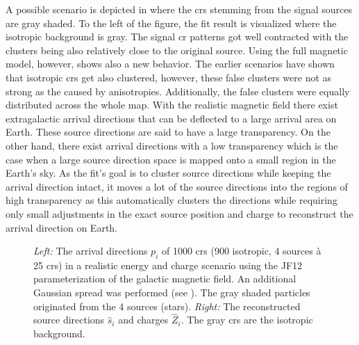 A possible scenario is depicted in  where the \glspl{cr} stemming from the signal sources are gray shaded. To the left of the figure, the fit result is visualized where the isotropic background is gray. The signal \gls{cr} patterns got well contracted with the clusters being also relatively close to the original source. Using the full magnetic model, however, shows also a new behavior. The earlier scenarios have shown that isotropic \glspl{cr} get also clustered, however, these false clusters were not as strong as the caused by anisotropies. Additionally, the false clusters were equally distributed across the whole map. With the realistic magnetic field there exist extragalactic arrival directions that can be deflected to a large arrival area on Earth. These source directions are said to have a large transparency. On the other hand, there exist arrival directions with a low transparency which is the case when a large source direction space is mapped onto a small region in the Earth's sky. As the fit's goal is to cluster source directions while keeping the arrival direction intact, it moves a lot of the source directions into the regions of high transparency as this automatically clusters the directions while requiring only small adjustments in the exact source position and charge to reconstruct the arrival direction on Earth.
\begin{figure}[ht!]
    \centering
    \begin{minipage}{0.49\textwidth}
    \end{minipage}
    \begin{minipage}{0.49\textwidth}
    \end{minipage}
    \caption{\emph{Left:} The arrival directions \(p_i\) of 1000 \glspl{cr} (900 isotropic, 4 sources \`a 25 \glspl{cr}) in a realistic energy and charge scenario using the JF12 parameterization of the galactic magnetic field. An additional Gaussian spread was performed (see ). The gray shaded particles originated from the 4 sources (stars). \emph{Right:} The reconstructed source directions \(\hat s_i\) and charges \(\hat Z_i\). The gray \glspl{cr} are the isotropic background.}\label{fig:jf12-anisotropic}
\end{figure}

